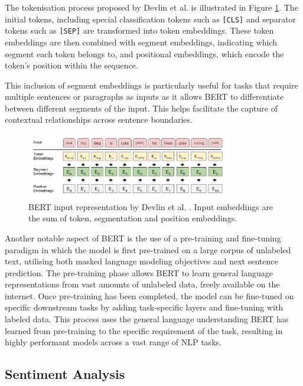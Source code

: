 The tokenisation process proposed by Devlin et al. \cite{BERT} is illustrated in Figure \ref{fig:bert}. The initial tokens, including special classification tokens such as \verb|[CLS]| and separator tokens such as \verb|[SEP]| are transformed into token embeddings. These token embeddings are then combined with segment embeddings, indicating which segment each token belongs to, and positional embeddings, which encode the token's position within the sequence.

This inclusion of segment embeddings is particularly useful for tasks that require multiple sentences or paragraphs as inputs as it allows BERT to differentiate between different segments of the input. This helps facilitate the capture of contextual relationships across sentence boundaries.

\begin{figure}[H]
    \centering
    \includegraphics[width=0.8\textwidth]{graphs/bert.png}
    \caption{BERT input representation by Devlin et al. \cite{BERT}. Input embeddings are the sum of token, segmentation and position embeddings.}
    \label{fig:bert}
\end{figure}

Another notable aspect of BERT is the use of a pre-training and fine-tuning paradigm in which the model is first pre-trained on a large corpus of unlabeled text, utilising both masked language modeling objectives and next sentence prediction. The pre-training phase allows BERT to learn general language representations from vast amounts of unlabeled data, freely available on the internet. Once pre-training has been completed, the model can be fine-tuned on specific downstream tasks by adding task-specific layers and fine-tuning with labeled data. This process uses the general language understanding BERT has learned from pre-training to the specific requirement of the task, resulting in highly performant models across a vast range of NLP tasks.

\subsection{Sentiment Analysis}

